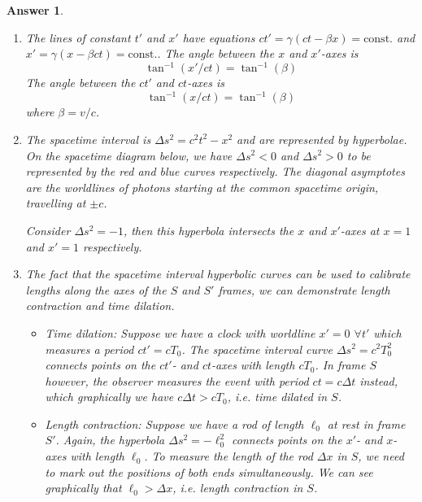 \documentclass[a4paper]{article}
\newtheorem{ans}{Answer}[subsection]
\theoremstyle{new}
\begin{document}
\begin{ans}\leavevmode
\begin{enumerate}[label=(\alph*)]
\item The lines of constant $t'$ and $x'$ have equations $ct'=\gamma(ct-\beta x)=\text{const.}$ and $x'=\gamma(x-\beta ct)=\text{const.}$. The angle between the $x$ and $x'$-axes is
$$\tan^{-1}(x'/ct)=\tan^{-1}(\beta)$$
The angle between the $ct'$ and $ct$-axes is
$$\tan^{-1}(x/ct)=\tan^{-1}(\beta)$$
where $\beta=v/c$.
\item The spacetime interval is $\Delta s^2=c^2t^2-x^2$ and are represented by hyperbolae. On the spacetime diagram below, we have $\Delta s^2<0$ and $\Delta s^2>0$ to be represented by the red and blue curves respectively. The diagonal asymptotes are the worldlines of photons starting at the common spacetime origin, travelling at $\pm c$.
\begin{center}
\end{center}
Consider $\Delta s^2=-1$, then this hyperbola intersects the $x$ and $x'$-axes at $x=1$ and $x'=1$ respectively.
\item The fact that the spacetime interval hyperbolic curves can be used to calibrate lengths along the axes of the $S$ and $S'$ frames, we can demonstrate length contraction and time dilation. 
\begin{itemize}
    \item Time dilation: Suppose we have a clock with worldline $x'=0$ $\forall t'$ which measures a period $ct'=cT_0$. The spacetime interval curve $\Delta s^2=c^2T_0^2$ connects points on the $ct'$- and $ct$-axes with length $cT_0$. In frame $S$ however, the observer measures the event with period $ct=c\Delta t$ instead, which graphically we have $c\Delta t>cT_0$, i.e. time dilated in $S$.
    \item Length contraction: Suppose we have a rod of length $\ell_0$ at rest in frame $S'$. Again, the hyperbola $\Delta s^2=-\ell_0^2$ connects points on the $x'$- and $x$-axes with length $\ell_0$. To measure the length of the rod $\Delta x$ in $S$, we need to mark out the positions of both ends simultaneously. We can see graphically that $\ell_0>\Delta x$, i.e. length contraction in $S$.
\end{itemize}
\end{enumerate}
\end{ans}
\end{document}
